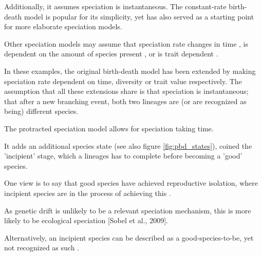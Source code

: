 Additionally, it assumes speciation is instantaneous.
The constant-rate birth-death model is popular for its simplicity, yet
has also served as a starting point for more elaborate speciation models.


Other speciation models may assume that speciation rate changes in 
time \cite{rabosky2008explosive}, is dependent on the amount of species 
present \cite{etienne2011diversity}, or is trait dependent \cite{fitzjohn2009estimating}.

In these examples, the original birth-death model has been extended by making 
speciation rate dependent on time, diversity or trait value respectively.
The assumption that all these extensions share is that speciation is instantaneous;
that after a new branching event, both two lineages are (or are recognized as being) different
species.



The protracted speciation model \cite{etienne2012prolonging} allows for speciation taking time.

It adds an additional species state (see also figure \ref{fig:pbd_states}),
coined the 'incipient' stage, which a lineages has to complete before becoming
a 'good' species.

One view is to say that good species have achieved reproductive isolation,
where incipient species are in the process of achieving this .

As genetic drift is unlikely to be a relevant speciation mechanism,
this is more likely to be ecological speciation [Sobel et al., 2009]. 

Alternatively, an incipient species can be described as a good-species-to-be,
yet not recognized as such .

